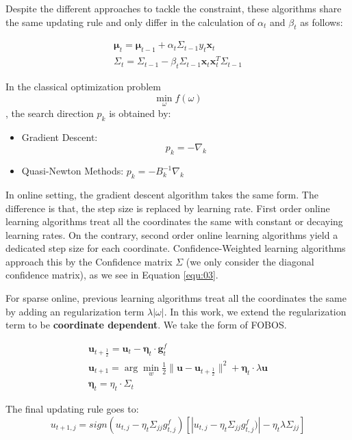 \documentclass{article}
\begin{document}
Despite the different approaches to tackle the constraint, these algorithms 
share the same updating rule and only differ in the calculation of $\alpha_t$ 
and $\beta_t$ as follows:

\begin{equation}
  \begin{aligned}
    \bm{\mu}_t = \bm{\mu}_{t-1} + \alpha_t\Sigma_{t-1}y_t\bm{x}_t  \\
    \Sigma_t = \Sigma_{t-1} - \beta_t\Sigma_{t-1}\bm{x}_t\bm{x}_t^T\Sigma_{t-1}
  \end{aligned}
  \label{equ:03}
\end{equation}

In the classical optimization problem $$\min_{\omega}f(\omega)$$, the
search direction $p_k$ is obtained by:
\begin{itemize}
  \item Gradient Descent: $$p_k = -\nabla_k$$
  \item Quasi-Newton Methods: $p_k = -B_k^{-1}\nabla_k$
\end{itemize}

In online setting, the gradient descent algorithm takes the same form.
The difference is that, the step size is replaced by learning rate.
First order online learning algorithms treat all the coordinates the
same with constant or decaying learning rates. On the contrary, second
order online learning algorithms yield a dedicated step size for each
coordinate. Confidence-Weighted learning algorithms approach this by
the Confidence matrix $\Sigma$ (we only consider the diagonal
confidence matrix), as we see in Equation \ref{equ:03}.

For sparse online, previous learning algorithms treat all the
coordinates the same by adding an regularization term
$\lambda|\omega|$. In this work, we extend the regularization term to
be \textbf{coordinate dependent}. We take the form of FOBOS.

\begin{equation}
  \begin{aligned}
    \bm{u}_{t+\frac{1}{2}} = \bm{u}_t - \bm{\eta}_t\cdot\bm{g}_t^f \\
    \bm{u}_{t+1} = \arg\min_w{\frac{1}{2}\|\bm{u} -
    \bm{u}_{t+\frac{1}{2}}\|^2 + \bm{\eta}_{t}\cdot\lambda\bm{u}} \\
    \bm{\eta}_t = \eta_t\cdot\Sigma_t
  \end{aligned}
  \label{equ:04}
\end{equation}

The final updating rule goes to:
\begin{equation}
  u_{t+1,j} = sign(u_{t,j} - \eta_t\Sigma_{jj}g_{t,j}^f)
  [|u_{t,j} - \eta_t\Sigma_{jj}g_{t,j}^f)| - \eta_t\lambda\Sigma_{jj}]
  \label{equ:05}
\end{equation}
\end{document}
